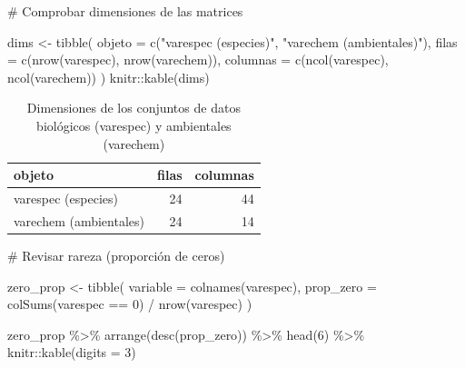 \documentclass[
  spanish,
  11pt,
  a4paper,
  DIV=11,
  numbers=noendperiod]{scrartcl}
\newenvironment{Shaded}{\begin{snugshade}}{\end{snugshade}}
\newcommand{\AttributeTok}[1]{\textcolor[rgb]{0.40,0.45,0.13}{#1}}
\newcommand{\CommentTok}[1]{\textcolor[rgb]{0.37,0.37,0.37}{#1}}
\newcommand{\DecValTok}[1]{\textcolor[rgb]{0.68,0.00,0.00}{#1}}
\newcommand{\FunctionTok}[1]{\textcolor[rgb]{0.28,0.35,0.67}{#1}}
\newcommand{\NormalTok}[1]{\textcolor[rgb]{0.00,0.23,0.31}{#1}}
\newcommand{\OtherTok}[1]{\textcolor[rgb]{0.00,0.23,0.31}{#1}}
\newcommand{\SpecialCharTok}[1]{\textcolor[rgb]{0.37,0.37,0.37}{#1}}
\newcommand{\StringTok}[1]{\textcolor[rgb]{0.13,0.47,0.30}{#1}}
\begin{document}
\begin{Shaded}
\begin{Highlighting}[numbers=left,,]
\CommentTok{\#  Comprobar dimensiones de las matrices}

\NormalTok{dims }\OtherTok{\textless{}{-}} \FunctionTok{tibble}\NormalTok{(}
\AttributeTok{objeto =} \FunctionTok{c}\NormalTok{(}\StringTok{"varespec (especies)"}\NormalTok{, }\StringTok{"varechem (ambientales)"}\NormalTok{),}
\AttributeTok{filas =} \FunctionTok{c}\NormalTok{(}\FunctionTok{nrow}\NormalTok{(varespec), }\FunctionTok{nrow}\NormalTok{(varechem)),}
\AttributeTok{columnas =} \FunctionTok{c}\NormalTok{(}\FunctionTok{ncol}\NormalTok{(varespec), }\FunctionTok{ncol}\NormalTok{(varechem))}
\NormalTok{)}
\NormalTok{knitr}\SpecialCharTok{::}\FunctionTok{kable}\NormalTok{(dims)}
\end{Highlighting}
\end{Shaded}

\begin{longtable}[]{@{}lrr@{}}

\caption{\label{tbl-cca-dimensiones}Dimensiones de los conjuntos de
datos biológicos (varespec) y ambientales (varechem)}

\tabularnewline

\toprule\noalign{}
objeto & filas & columnas \\
\midrule\noalign{}
\endhead
\bottomrule\noalign{}
\endlastfoot
varespec (especies) & 24 & 44 \\
varechem (ambientales) & 24 & 14 \\

\end{longtable}

\begin{Shaded}
\begin{Highlighting}[numbers=left,,]
\CommentTok{\#  Revisar rareza (proporción de ceros)}

\NormalTok{zero\_prop }\OtherTok{\textless{}{-}} \FunctionTok{tibble}\NormalTok{(}
\AttributeTok{variable =} \FunctionTok{colnames}\NormalTok{(varespec),}
\AttributeTok{prop\_zero =} \FunctionTok{colSums}\NormalTok{(varespec }\SpecialCharTok{==} \DecValTok{0}\NormalTok{) }\SpecialCharTok{/} \FunctionTok{nrow}\NormalTok{(varespec)}
\NormalTok{)}

\NormalTok{zero\_prop }\SpecialCharTok{\%\textgreater{}\%}
\FunctionTok{arrange}\NormalTok{(}\FunctionTok{desc}\NormalTok{(prop\_zero)) }\SpecialCharTok{\%\textgreater{}\%}
\FunctionTok{head}\NormalTok{(}\DecValTok{6}\NormalTok{) }\SpecialCharTok{\%\textgreater{}\%}
\NormalTok{knitr}\SpecialCharTok{::}\FunctionTok{kable}\NormalTok{(}\AttributeTok{digits =} \DecValTok{3}\NormalTok{)}
\end{Highlighting}
\end{Shaded}
\end{document}
